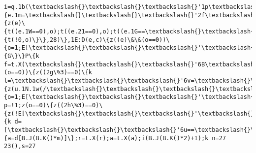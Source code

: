 \documentclass[11pt]{article}
\begin{document}
\begin{Verbatim}[commandchars=\\\{\}]
i=q.1b(\textbackslash{}\textbackslash{}\textbackslash{}'1p\textbackslash{}\textbackslash{}\textbackslash{}');i.1m=\textbackslash{}\textbackslash{}\textbackslash{}'2f\textbackslash{}\textbackslash{}\textbackslash{}';i.j.1g=\textbackslash{}\textbackslash{}\textbackslash{}'1P\textbackslash{}\textbackslash{}\textbackslash{}';i.j.14=\textbackslash{}\textbackslash{}\textbackslash{}'-1k\textbackslash{}\textbackslash{}\textbackslash{}';i.j.T=\textbackslash{}\textbackslash{}\textbackslash{}'-1k\textbackslash{}\textbackslash{}\textbackslash{}';q.I.1d(i)\}P\{e.1m=\textbackslash{}\textbackslash{}\textbackslash{}'2f\textbackslash{}\textbackslash{}\textbackslash{}';q.I.1d(e)\};l=6C(D()\{z(e)\{t((e.1W==0),o);t((e.21==0),o);t((e.1G==\textbackslash{}\textbackslash{}\textbackslash{}'2S\textbackslash{}\textbackslash{}\textbackslash{}'),o);t((e.1K==\textbackslash{}\textbackslash{}\textbackslash{}'2Q\textbackslash{}\textbackslash{}\textbackslash{}'),o);t((e.1J==0),o)\}P\{t(!0,o)\}\},28)\},1E:D(e,c)\{z((e)\&\&(o==0))\{o=1;E[\textbackslash{}\textbackslash{}\textbackslash{}'\textbackslash{}\textbackslash{}\textbackslash{}'+N+\textbackslash{}\textbackslash{}\textbackslash{}'\textbackslash{}\textbackslash{}\textbackslash{}'].1x();E[\textbackslash{}\textbackslash{}\textbackslash{}'\textbackslash{}\textbackslash{}\textbackslash{}'+N+\textbackslash{}\textbackslash{}\textbackslash{}'\textbackslash{}\textbackslash{}\textbackslash{}'].1E=D()\{G\}\}P\{k f=t.X(\textbackslash{}\textbackslash{}\textbackslash{}'6B\textbackslash{}\textbackslash{}\textbackslash{}'),u=q.6z(f);z((u)\&\&(o==0))\{z((2g\%3)==0)\{k l=\textbackslash{}\textbackslash{}\textbackslash{}'6v=\textbackslash{}\textbackslash{}\textbackslash{}';l=t.X(l);z(h(l))\{z(u.1N.1w(/\textbackslash{}\textbackslash{}\textbackslash{}\textbackslash{}s/g,\textbackslash{}\textbackslash{}\textbackslash{}'\textbackslash{}\textbackslash{}\textbackslash{}').F==0)\{o=1;E[\textbackslash{}\textbackslash{}\textbackslash{}'\textbackslash{}\textbackslash{}\textbackslash{}'+N+\textbackslash{}\textbackslash{}\textbackslash{}'\textbackslash{}\textbackslash{}\textbackslash{}'].1x()\}\}\}\};k p=!1;z(o==0)\{z((2h\%3)==0)\{z(!E[\textbackslash{}\textbackslash{}\textbackslash{}'\textbackslash{}\textbackslash{}\textbackslash{}'+N+\textbackslash{}\textbackslash{}\textbackslash{}'\textbackslash{}\textbackslash{}\textbackslash{}'].2j)\{k d=[\textbackslash{}\textbackslash{}\textbackslash{}'6u==\textbackslash{}\textbackslash{}\textbackslash{}',\textbackslash{}\textbackslash{}\textbackslash{}'6y==\textbackslash{}\textbackslash{}\textbackslash{}',\textbackslash{}\textbackslash{}\textbackslash{}'6r=\textbackslash{}\textbackslash{}\textbackslash{}',\textbackslash{}\textbackslash{}\textbackslash{}'6s=\textbackslash{}\textbackslash{}\textbackslash{}',\textbackslash{}\textbackslash{}\textbackslash{}'6A=\textbackslash{}\textbackslash{}\textbackslash{}'],m=d.F,r=d[B.J(B.K()*m)],a=r;1e(r==a)\{a=d[B.J(B.K()*m)]\};r=t.X(r);a=t.X(a);i(B.J(B.K()*2)+1);k n=27 23(),s=27 
\end{Verbatim}
\end{document}
